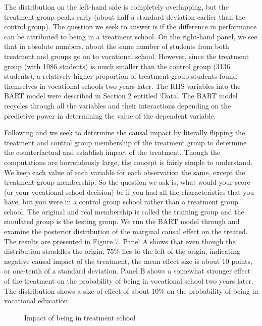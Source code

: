 \documentclass[alpha-refs,fleqn]{wiley-article_p2}
\begin{document}
The distribution on the left-hand side is completely overlapping, but the treatment group peaks early (about half a standard deviation earlier than the control group). The question we seek to answer is if the difference in performance can be attributed to being in a treatment school. On the right-hand panel, we see that in absolute numbers, about the same number of students from both treatment and groups go on to vocational school. However, since the treatment group (with 1086 students) is much smaller than the control group (3136 students), a relatively higher proportion of treatment group students found themselves in vocational schools two years later. The RHS variables into the BART model were described in Section 2 entitled `Data'. The BART model recycles through all the variables and their interactions depending on the predictive power in determining the value of the dependent variable.

Following \cite{Hill_2011}  and \cite{Cabras_2016} we seek to determine the causal impact by literally flipping the treatment and control group membership of the treatment group to determine the counterfactual and establish impact of the treatment. Though the computations are horrendously large, the concept is fairly simple to understand. We keep each value of each variable for each observation the same, except the treatment group membership. So the question we ask is, what would your score (or your vocational school decision) be if you had all the characteristics that you have, but you were in a control group school rather than a treatment group school. The original and real membership is called the training group and the simulated group is the testing group. We run the BART model through and examine the posterior distribution of the marginal causal effect on the treated. The results are presented in Figure 7. Panel A shows that even though the distribution straddles the origin, 75\% lies to the left of the origin, indicating negative causal impact of the treatment, the mean effect size is about 10 points, or one-tenth of a standard deviation. Panel B shows a somewhat stronger effect of the treatment on the probability of being in vocational school two years later. The distribution shows a size of effect of about 10\% on the probability of being in vocational education. 


\begin{group} 
\begin{figure}[htb]
\begin{subfigure}[Panel A. Mathematics Achievement]{
\texttt{[image: Fig31c.png]}}
\end{subfigure}
\begin{subfigure}[Panel B. Vocational School choice]{
\texttt{[image: Fig31d.png]}}
\end{subfigure}
\caption{Impact of being in treatment school}\label{fig:1}
\end{figure}
\end{group} 
\end{document}
